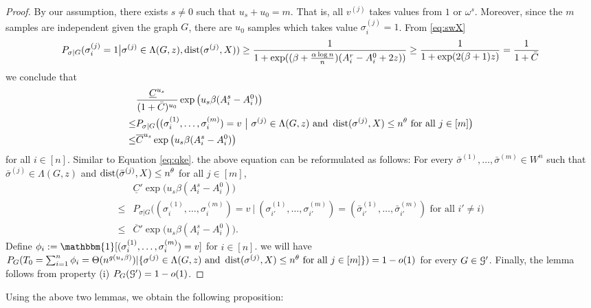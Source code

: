 \documentclass{article}
\begin{document}
\begin{proof}
	
	By our assumption, there exists $s\neq 0$ such that
	$u_s + u_0 = m$. That is, all $v^{(j)}$ takes values from $1$ or $\omega^s$.
	Moreover, since the $m$ samples are independent given the graph $G$, there are $u_0$ samples which takes value $\sigma_i^{(j)} = 1$.
	From \eqref{eq:swX}
	\begin{equation}
	P_{\sigma|G}(\sigma_i^{(j)} = 1 \big| \sigma^{(j)}\in \Lambda(G,z) ,\operatorname{dist}(\sigma^{(j)}, X)) \geq \frac{1}{1+\exp((\beta + \frac{\alpha \log n}{n})(A_i^r - A_i^0 + 2z))}
	\geq \frac{1}{1+\exp(2(\beta+1)z)} = \frac{1}{1+\bar{C}}
	\end{equation}
 	we conclude that
	\begin{align*}
	& \frac{\underline{C}^{u_s}}{(1+\bar{C})^{u_0}}
	\exp\big(u_s\beta (A^s_i-A^0_i) \big) \\
	\le
	& P_{\sigma|G} \big( (\sigma_i^{(1)},\dots,\sigma_i^{(m)})=v ~\big|~ \sigma^{(j)}\in  \Lambda(G, z)
	\text{~and~} \operatorname{dist}(\sigma^{(j)}, X) \le n^\theta
	\text{~for all~} j\in[m] \big) \\
	\le & \overline{C}^{u_s}
	\exp\big(u_s \beta (A^s_i-A^0_i) \big)
	\end{align*}
	for all $i\in[n]$.
	Similar to Equation \eqref{eq:qke}. the above equation can be reformulated as follows:
	For every $\bar{\sigma}^{(1)},\dots,\bar{\sigma}^{(m)}\in W^n$ such that $\bar{\sigma}^{(j)}\in  \Lambda(G, z)$
	and $\operatorname{dist}(\bar{\sigma}^{(j)}, X) \le n^\theta$
	for all $j\in[m]$,
	\begin{equation} \label{eq:s56}
	\begin{aligned}
	& \underline{C}'
	\exp\big( u_s  \beta (A^s_i-A^0_i) \big) \\
	\le
	& P_{\sigma|G} \big( (\sigma_i^{(1)},\dots,\sigma_i^{(m)})=v ~\big|~ (\sigma_{i'}^{(1)},\dots,\sigma_{i'}^{(m)})= (\bar{\sigma}_{i'}^{(1)},\dots,\bar{\sigma}_{i'}^{(m)}) \text{~for all~} i'\neq i \big) \\
	\le & \overline{C}'
	\exp\big(u_s  \beta (A^s_i-A^0_i) \big).
	\end{aligned}
	\end{equation}
	Define 
	$\phi_i := \mathbbm{1}[(\sigma_i^{(1)},\dots,\sigma_i^{(m)})=v]$ for $i\in[n]$.
	we will have $P_{G}(T_0=\sum_{i=1}^n \phi_i=\Theta(n^{g(u_s\beta)}) | \{\sigma^{(j)}\in  \Lambda(G, z)
	\text{~and~} \operatorname{dist}(\sigma^{(j)}, X) \le n^\theta
	\text{~for all~} j\in[m]\})= 1-o(1)$  for every $G\in\mathcal{G}'$.
	Finally, the lemma follows from property (i) $P_G(\mathcal{G}')=1-o(1)$.
\end{proof}
Using the above two lemmas, we obtain the following proposition:
\end{document}
